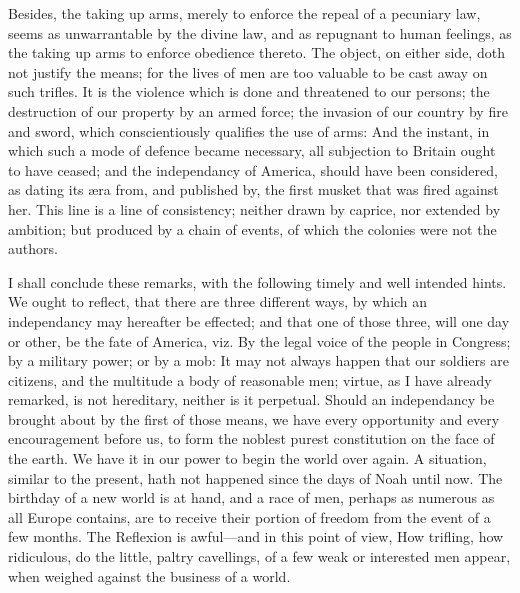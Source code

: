 \documentclass[12pt,oneside]{memoir}
\begin{document}
Besides, the taking up arms, merely to enforce the repeal of a pecuniary law, seems as unwarrantable by the divine law, and as repugnant to human feelings, as the taking up arms to enforce obedience thereto. The object, on either side, doth not justify the means; for the lives of men are too valuable to be cast away on such trifles. It is the violence which is done and threatened to our persons; the destruction of our property by an armed force; the invasion of our country by fire and sword, which conscientiously qualifies the use of arms: And the instant, in which such a mode of defence became necessary, all subjection to Britain ought to have ceased; and the independancy of America, should have been considered, as dating its æra from, and published by, the first musket that was fired against her. This line is a line of consistency; neither drawn by caprice, nor extended by ambition; but produced by a chain of events, of which the colonies were not the authors.

I shall conclude these remarks, with the following timely and well intended hints. We ought to reflect, that there are three different ways, by which an independancy may hereafter be effected; and that one of those three, will one day or other, be the fate of America, viz. By the legal voice of the people in Congress; by a military power; or by a mob: It may not always happen that our soldiers are citizens, and the multitude a body of reasonable men; virtue, as I have already remarked, is not hereditary, neither is it perpetual. Should an independancy be brought about by the first of those means, we have every opportunity and every encouragement before us, to form the noblest purest constitution on the face of the earth. We have it in our power to begin the world over again. A situation, similar to the present, hath not happened since the days of Noah until now. The birthday of a new world is at hand, and a race of men, perhaps as numerous as all Europe contains, are to receive their portion of freedom from the event of a few months. The Reflexion is awful---and in this point of view, How trifling, how ridiculous, do the little, paltry cavellings, of a few weak or interested men appear, when weighed against the business of a world.
\end{document}
